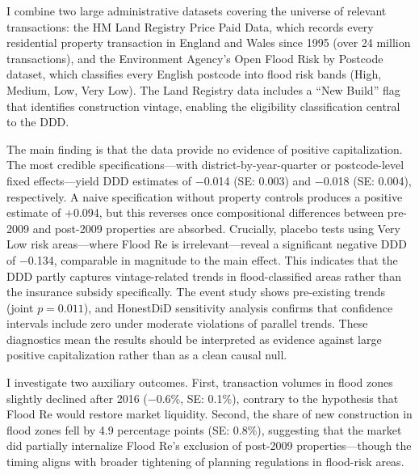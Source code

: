 \documentclass[12pt]{article}
\begin{document}
I combine two large administrative datasets covering the universe of relevant transactions: the HM Land Registry Price Paid Data, which records every residential property transaction in England and Wales since 1995 (over 24 million transactions), and the Environment Agency's Open Flood Risk by Postcode dataset, which classifies every English postcode into flood risk bands (High, Medium, Low, Very Low). The Land Registry data includes a ``New Build'' flag that identifies construction vintage, enabling the eligibility classification central to the DDD.

The main finding is that the data provide no evidence of positive capitalization. The most credible specifications---with district-by-year-quarter or postcode-level fixed effects---yield DDD estimates of $-$0.014 (SE: 0.003) and $-$0.018 (SE: 0.004), respectively. A naive specification without property controls produces a positive estimate of $+$0.094, but this reverses once compositional differences between pre-2009 and post-2009 properties are absorbed. Crucially, placebo tests using Very Low risk areas---where Flood Re is irrelevant---reveal a significant negative DDD of $-$0.134, comparable in magnitude to the main effect. This indicates that the DDD partly captures vintage-related trends in flood-classified areas rather than the insurance subsidy specifically. The event study shows pre-existing trends (joint $p = 0.011$), and HonestDiD sensitivity analysis confirms that confidence intervals include zero under moderate violations of parallel trends. These diagnostics mean the results should be interpreted as evidence against large positive capitalization rather than as a clean causal null.

I investigate two auxiliary outcomes. First, transaction volumes in flood zones slightly declined after 2016 ($-$0.6\%, SE: 0.1\%), contrary to the hypothesis that Flood Re would restore market liquidity. Second, the share of new construction in flood zones fell by 4.9 percentage points (SE: 0.8\%), suggesting that the market did partially internalize Flood Re's exclusion of post-2009 properties---though the timing aligns with broader tightening of planning regulations in flood-risk areas.
\end{document}
